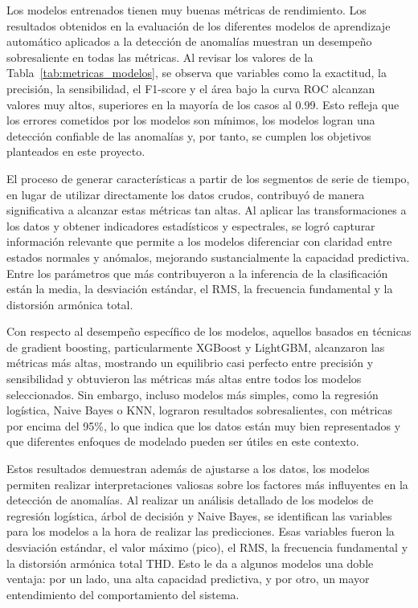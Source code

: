 \documentclass[11pt,a4paper,spanish]{book}
\numberwithin{equation}{chapter}
\numberwithin{figure}{chapter}
\begin{document}
Los modelos entrenados tienen muy buenas métricas de rendimiento. 
Los resultados obtenidos en la evaluación de los diferentes modelos de aprendizaje 
automático aplicados a la detección de anomalías muestran un desempeño sobresaliente 
en todas las métricas. 
Al revisar los valores de la Tabla~\ref{tab:metricas_modelos}, se observa que variables 
como la exactitud, 
la precisión, la sensibilidad, el F1-score y el área bajo la curva ROC alcanzan 
valores muy altos, superiores en la mayoría de los casos al 0.99. Esto refleja que los 
errores cometidos por los modelos son mínimos, los modelos logran una detección 
confiable de las anomalías y, por tanto, se cumplen los objetivos planteados en 
este proyecto.


El proceso de generar características a partir de los segmentos de serie de tiempo, 
en lugar de utilizar directamente los datos crudos, contribuyó de manera significativa 
a alcanzar estas métricas tan altas. Al aplicar las transformaciones a los datos y 
obtener indicadores estadísticos y espectrales, se logró capturar información relevante 
que permite a los modelos diferenciar con claridad entre estados normales y anómalos, 
mejorando sustancialmente la capacidad predictiva. Entre los parámetros que más 
contribuyeron a la inferencia de la clasificación están la media, la desviación estándar, 
el RMS, la frecuencia fundamental y la distorsión armónica total.


Con respecto al desempeño específico de los modelos, aquellos basados en técnicas de 
gradient boosting, particularmente XGBoost y LightGBM, alcanzaron las métricas más altas, 
mostrando un equilibrio casi perfecto entre precisión y sensibilidad y obtuvieron las 
métricas más altas entre todos los modelos seleccionados. Sin embargo, incluso modelos 
más simples, como la regresión logística, Naive Bayes o KNN, lograron resultados 
sobresalientes, con métricas por encima del 95\%, lo que indica que los datos están muy 
bien representados y que diferentes enfoques de modelado pueden ser útiles en este 
contexto.


Estos resultados demuestran además de ajustarse a los datos, los modelos permiten 
realizar interpretaciones valiosas sobre los factores más influyentes en la detección 
de anomalías. 
Al realizar un análisis detallado de los modelos de regresión logística, árbol de 
decisión y Naive Bayes, se identifican las variables para los modelos a la hora de 
realizar las predicciones. Esas variables fueron la desviación estándar, el valor 
máximo (pico), el RMS, la frecuencia fundamental y la distorsión armónica total THD. 
Esto le da a algunos modelos una doble ventaja: por un lado, una alta capacidad 
predictiva, y por otro, un mayor entendimiento del comportamiento del sistema.
\end{document}
